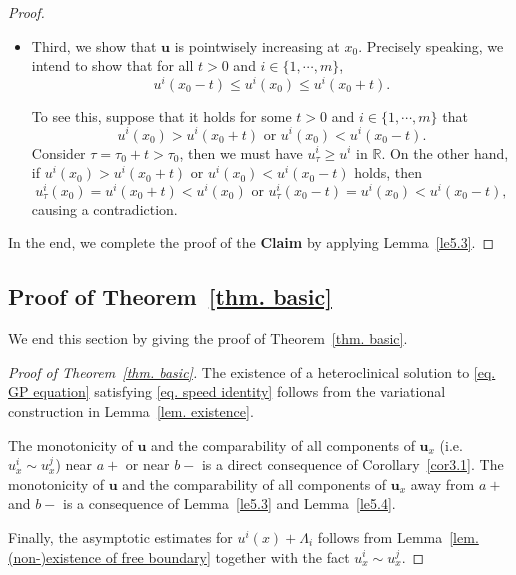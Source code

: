\documentclass[11pt,twoside,reqno]{amsart}
\numberwithin{equation}{section}
\begin{document}
\begin{proof}
\begin{itemize}
    \item Third, we show that $\mathbf{u}$ is pointwisely increasing at $x_{0}$. Precisely speaking, we intend to show that for all $t>0$ and $i\in\{1,\cdots,m\}$,
    \begin{equation*}
        u^{i}(x_{0}-t)\leq u^{i}(x_{0})\leq u^{i}(x_{0}+t).
    \end{equation*}

    To see this, suppose that it holds for some $t>0$ and $i\in\{1,\cdots,m\}$ that
    \begin{equation*}
        u^{i}(x_{0})>u^{i}(x_{0}+t)\mbox{ or }u^{i}(x_{0})<u^{i}(x_{0}-t).
    \end{equation*}
    Consider $\tau=\tau_{0}+t>\tau_{0}$, then we must have $u_{\tau}^{i}\geq u^{i}$ in $\mathbb{R}$. On the other hand, if $u^{i}(x_{0})>u^{i}(x_{0}+t)$ or $u^{i}(x_{0})<u^{i}(x_{0}-t)$ holds, then
    \begin{equation*}
        u_{\tau}^{i}(x_{0})=u^{i}(x_{0}+t)<u^{i}(x_{0})\mbox{ or }u_{\tau}^{i}(x_{0}-t)=u^{i}(x_{0})<u^{i}(x_{0}-t),
    \end{equation*}
    causing a contradiction.
\end{itemize}
In the end, we complete the proof of the \textbf{Claim} by applying Lemma~\ref{le5.3}.
\end{proof}

\subsection{Proof of Theorem~\ref{thm. basic}}
We end this section by giving the proof of Theorem~\ref{thm. basic}.
\begin{proof}[Proof of Theorem~\ref{thm. basic}]
The existence of a heteroclinical solution to \eqref{eq. GP equation} satisfying \eqref{eq. speed identity} follows from the variational construction in Lemma~\ref{lem. existence}.

The monotonicity of $\mathbf{u}$ and the comparability of all components of $\mathbf{u}_{x}$ (i.e. $u^{i}_{x}\sim u^{j}_{x}$) near $a+$ or near $b-$ is a direct consequence of Corollary~\ref{cor3.1}. The monotonicity of $\mathbf{u}$ and the comparability of all components of $\mathbf{u}_{x}$ away from $a+$ and $b-$ is a consequence of Lemma~\ref{le5.3} and Lemma~\ref{le5.4}.

Finally, the asymptotic estimates for $u^{i}(x)+\Lambda_{i}$ follows from Lemma~\ref{lem. (non-)existence of free boundary} together with the fact $u^{i}_{x}\sim u^{j}_{x}$.
\end{proof}
\end{document}
